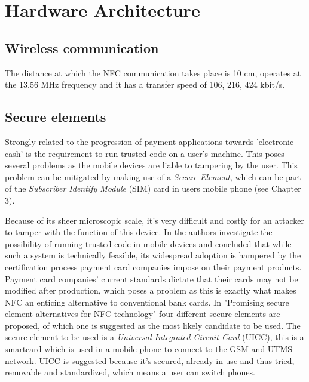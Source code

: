 \chapter{Hardware Architecture}
\label{chap:hardware_architecture}


\section{Wireless communication}
The distance at which the NFC communication takes place is 10 cm, operates at the 13.56 MHz frequency and it has a transfer speed of 106, 216, 424 kbit/s.


\section{Secure elements}
Strongly related to the progression of payment applications towards 'electronic cash' is the requirement to run trusted code on a user's machine.
This poses several problems as the mobile devices are liable to tampering by the user.
This problem can be mitigated by making use of a \textit{Secure Element}, which can be part of the \textit{Subscriber Identify Module} (SIM) card in users mobile phone (see Chapter 3).

Because of its sheer microscopic scale, it's very difficult and costly for an attacker to tamper with the function of this device.
In \cite{1497411} the authors investigate the possibility of running trusted code in mobile devices and concluded that while such a system is technically feasible, its widespread adoption is hampered by the certification process payment card companies impose on their payment products.
Payment card companies' current standards dictate that their cards may not be modified after production, which poses a problem as this is exactly what makes NFC an enticing alternative to conventional bank cards.
In "Promising secure element alternatives for NFC technology" four different secure elements are proposed, of which one is suggested as the most likely candidate to be used.
The secure element to be used is a \textit{Universal Integrated Circuit Card} (UICC), this is a smartcard which is used in a mobile phone to connect to the GSM and UTMS network. %
UICC is suggested because it's secured, already in use and thus tried, removable and standardized, which means a user can switch phones. 

